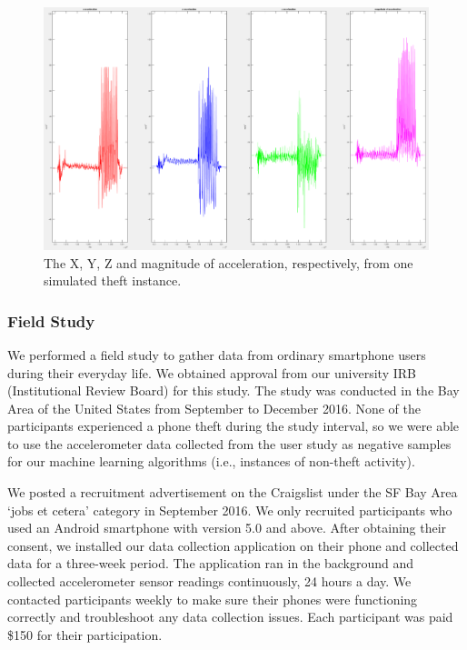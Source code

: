 \documentclass{soups}
\begin{document}
\begin{figure}[t]
\includegraphics[width=1.0\columnwidth]{pos_acc_separated.png}
\caption{The X, Y, Z and magnitude of acceleration, respectively, from one simulated theft instance.}
\label{fig:simtheft}
\end{figure}




\subsubsection{Field Study}
We performed a field study to gather data from ordinary smartphone users
during their everyday life.
We obtained approval from our university IRB (Institutional Review Board) for this study. 
The study was conducted in the Bay Area of the United States from September to December 2016.
None of the participants experienced a phone theft during the study interval,
so we were able to use the accelerometer data collected from the user study as negative samples for our machine learning algorithms (i.e., instances of non-theft activity).

We posted a recruitment advertisement on the Craigslist under the SF Bay Area `jobs et cetera' category in September 2016. 
We only recruited participants who used an Android smartphone with version 5.0 and above.
After obtaining their consent, we installed our data collection application on their phone and collected data for a three-week period.
The application ran in the background and collected accelerometer sensor readings continuously, 24 hours a day.
We contacted participants weekly to make sure their phones were functioning correctly and troubleshoot any data collection issues.
Each participant was paid \$150 for their participation.
\end{document}
